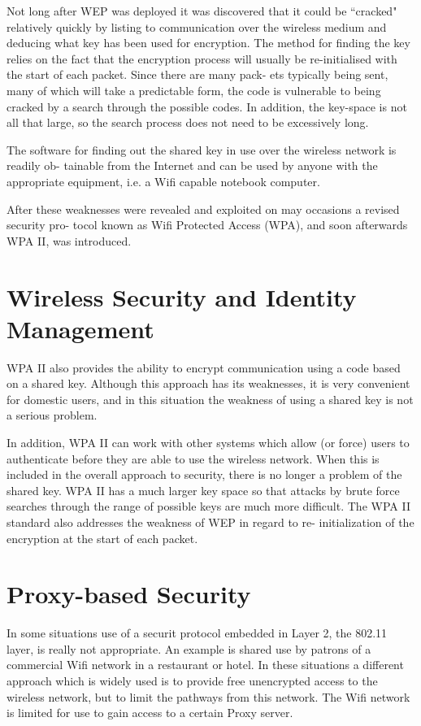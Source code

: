 Not long after WEP was deployed it was discovered that it could be ``cracked" relatively
quickly by listing to communication over the wireless medium and deducing what key has
been used for encryption. The method for finding the key relies on the fact that the encryption
process will usually be re-initialised with the start of each packet. Since there are many pack-
ets typically being sent, many of which will take a predictable form, the code is vulnerable
to being cracked by a search through the possible codes. In addition, the key-space is not all
that large, so the search process does not need to be excessively long.

The software for finding out the shared key in use over the wireless network is readily ob-
tainable from the Internet and can be used by anyone with the appropriate equipment, i.e. a
Wifi capable notebook computer.

After these weaknesses were revealed and exploited on may occasions a revised security pro-
tocol known as Wifi Protected Access (WPA), and soon afterwards WPA II, was introduced.

\section{Wireless Security and Identity Management}

WPA II also provides the ability to encrypt communication using a code based on a shared
key. Although this approach has its weaknesses, it is very convenient for domestic users, and
in this situation the weakness of using a shared key is not a serious problem.

In addition, WPA II can work with other systems which allow (or force) users to authenticate
before they are able to use the wireless network. When this is included in the overall approach
to security, there is no longer a problem of the shared key. WPA II has a much larger key
space so that attacks by brute force searches through the range of possible keys are much
more difficult. The WPA II standard also addresses the weakness of WEP in regard to re-
initialization of the encryption at the start of each packet.

\section{Proxy-based Security}

In some situations use of a securit protocol embedded in Layer 2, the 802.11 layer, is really
not appropriate. An example is shared use by patrons of a commercial Wifi network in a
restaurant or hotel. In these situations a different approach which is widely used is to provide
free unencrypted access to the wireless network, but to limit the pathways from this network.
The Wifi network is limited for use to gain access to a certain Proxy server.


